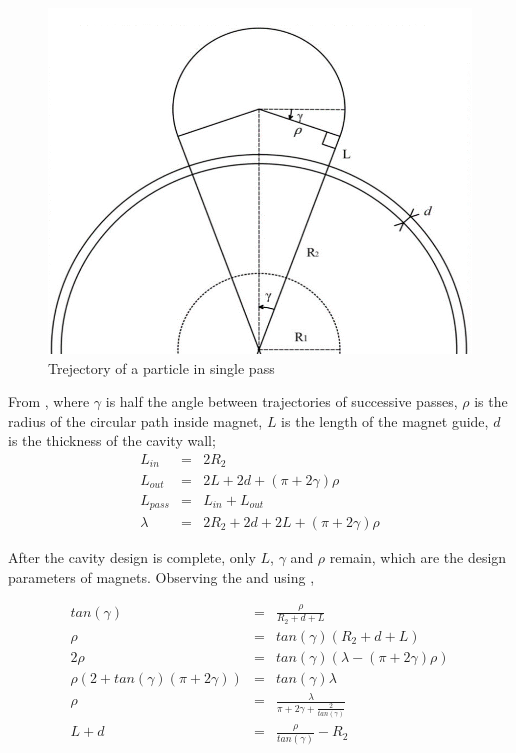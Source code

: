 \documentclass[a4paper,oneside,12pt]{report}
\numberwithin{equation}{chapter}
\begin{document}
\begin{figure}[H]    
    \centering
    \includegraphics[width=.8\linewidth]{./figures/design/magnet_design.png}
    \caption{Trejectory of a particle in single pass}
    \label{fig:magnet_design}
\end{figure}

From , where $\gamma$ is half the angle between trajectories of successive passes, $\rho$ is the radius of the circular path inside magnet, $L$ is the length of the magnet guide, $d$ is the thickness of the cavity wall;
\begin{eqnarray}
    L_{in} &=& 2R_2 \nonumber\\
    L_{out} &=& 2L + 2d + (\pi + 2\gamma)\rho \nonumber \\
    L_{pass} &=& L_{in} + L_{out}  \nonumber \\
    \lambda &=& 2R_2 + 2d + 2L + (\pi + 2\gamma)\rho \label{eq:magnet_lambda_constraint}
\end{eqnarray}

After the cavity design is complete, only $L$, $\gamma$ and $\rho$ remain, which are the design parameters of magnets.
Observing the  and using ,

\begin{eqnarray}
    tan(\gamma) &=& \frac{\rho}{R_2 + d + L} \nonumber \\
    \rho &=&  tan(\gamma) (R_2 + d + L) \nonumber\\
    2\rho &=& tan(\gamma) (\lambda - (\pi + 2\gamma)\rho) \nonumber\\
    \rho (2 + tan(\gamma)(\pi + 2\gamma)) &=&  tan(\gamma) \lambda \nonumber\\
    \rho &=& \frac{\lambda}{\pi + 2\gamma + \frac{2}{tan(\gamma)}} \label{eq:magnet_rho_constraint} \\
    L + d &=& \frac{\rho}{tan(\gamma)} - R_2 \label{eq:magnet_L_constraint}
\end{eqnarray}
\end{document}
